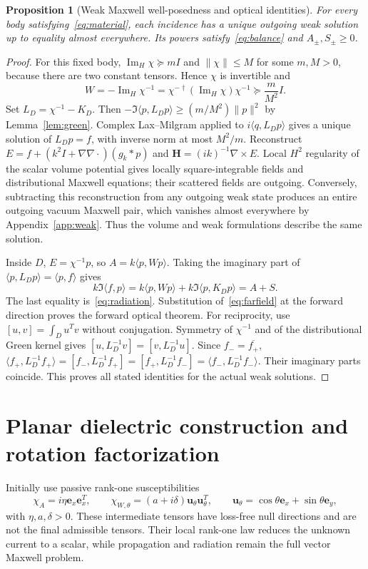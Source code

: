 \documentclass[11pt]{article}
\newtheorem{proposition}[theorem]{Proposition}
\newcommand{\ImH}{\operatorname{Im}_{\!H}}
\newcommand{\ey}{\mathbf e_y}
\newcommand{\ex}{\mathbf e_x}
\newcommand{\uvec}{\mathbf u_\theta}
\newcommand{\ip}[2]{\langle #1,#2\rangle}
\newcommand{\norm}[1]{\lVert #1\rVert}
\begin{document}
\begin{proposition}[Weak Maxwell well-posedness and optical identities]\label{prop:physical}
For every body satisfying~\eqref{eq:material}, each incidence has a unique outgoing weak solution up to equality almost everywhere. Its powers satisfy~\eqref{eq:balance} and $A_\pm,S_\pm\geq0$.
\end{proposition}
\begin{proof}
For this fixed body, $\ImH\chi\succeq mI$ and $\norm{\chi}\leq M$ for some $m,M>0$, because there are two constant tensors. Hence $\chi$ is invertible and
\begin{equation}\label{eq:tensor-coercivity}
 W=-\ImH\chi^{-1}=\chi^{-\dagger}(\ImH\chi)\chi^{-1}
 \succeq\frac{m}{M^2}I.
\end{equation}
Set $L_D=\chi^{-1}-K_D$. Then $-\Im\ip{p}{L_Dp}\geq(m/M^2)\norm{p}^2$ by Lemma~\ref{lem:green}. Complex Lax--Milgram applied to $i\ip{q}{L_Dp}$ gives a unique solution of $L_Dp=f$, with inverse norm at most $M^2/m$. Reconstruct $E=f+(k^2I+\nabla\nabla\cdot)(g_k*p)$ and $\mathbf H=(ik)^{-1}\nabla\times E$. Local $H^2$ regularity of the scalar volume potential gives locally square-integrable fields and distributional Maxwell equations; their scattered fields are outgoing. Conversely, subtracting this reconstruction from any outgoing weak state produces an entire outgoing vacuum Maxwell pair, which vanishes almost everywhere by Appendix~\ref{app:weak}. Thus the volume and weak formulations describe the same solution.

Inside $D$, $E=\chi^{-1}p$, so $A=k\ip{p}{Wp}$. Taking the imaginary part of $\ip{p}{L_Dp}=\ip{p}{f}$ gives
\begin{equation}\label{eq:work-balance}
 k\Im\ip{f}{p}=k\ip{p}{Wp}+k\Im\ip{p}{K_Dp}=A+S.
\end{equation}
The last equality is~\eqref{eq:radiation}. Substitution of~\eqref{eq:farfield} at the forward direction proves the forward optical theorem. For reciprocity, use $[u,v]=\int_Du^Tv$ without conjugation. Symmetry of $\chi^{-1}$ and of the distributional Green kernel gives $[u,L_D^{-1}v]=[v,L_D^{-1}u]$. Since $f_-=\overline{f_+}$, $\ip{f_+}{L_D^{-1}f_+}=[f_-,L_D^{-1}f_+]=[f_+,L_D^{-1}f_-]=\ip{f_-}{L_D^{-1}f_-}$. Their imaginary parts coincide. This proves all stated identities for the actual weak solutions.
\end{proof}

\section{Planar dielectric construction and rotation factorization}\label{sec:planar}
Initially use passive rank-one susceptibilities
\begin{equation}\label{eq:rankone}
 \chi_A=i\eta\ex\ex^T,\qquad
 \chi_{W,\theta}=(a+i\delta)\uvec\uvec^T,\qquad
 \uvec=\cos\theta\ex+\sin\theta\ey,
\end{equation}
with $\eta,a,\delta>0$. These intermediate tensors have loss-free null directions and are not the final admissible tensors. Their local rank-one law reduces the unknown current to a scalar, while propagation and radiation remain the full vector Maxwell problem.
\end{document}
